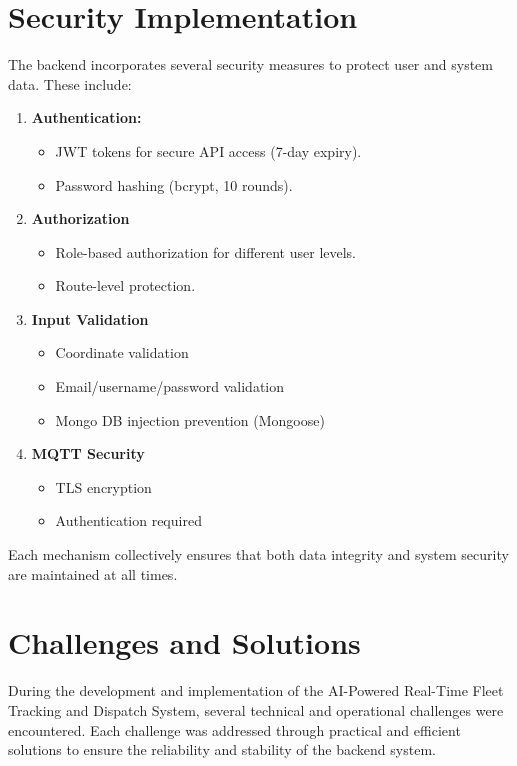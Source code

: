 \section{Security Implementation}
The backend incorporates several security measures to protect user and system data. These include:
\begin{enumerate}
    \item \textbf{Authentication:}
    \begin{itemize}
        \item JWT tokens for secure API access (7-day expiry).
        \item Password hashing (bcrypt, 10 rounds).
    \end{itemize}
    \item \textbf{Authorization}
    \begin{itemize}
        \item Role-based authorization for different user levels.
        \item Route-level protection.
    \end{itemize}
    \item \textbf{Input Validation}
    \begin{itemize}
        \item Coordinate validation
        \item Email/username/password validation
        \item Mongo DB injection prevention (Mongoose)
    \end{itemize}
    \item \textbf{MQTT Security}
    \begin{itemize}
        \item TLS encryption
        \item Authentication required
    \end{itemize}
\end{enumerate}
Each mechanism collectively ensures that both data integrity and system security are maintained at all times.

\section{Challenges and Solutions}
During the development and implementation of the AI-Powered Real-Time Fleet Tracking and Dispatch System, several technical and operational challenges were encountered. Each challenge was addressed through practical and efficient solutions to ensure the reliability and stability of the backend system.

